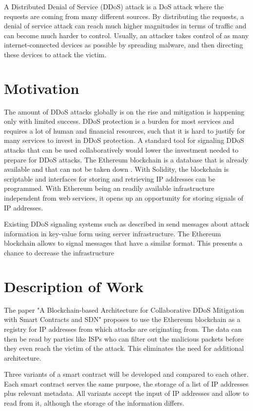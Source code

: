 A Distributed Denial of Service (DDoS) attack is a DoS attack where the requests are coming from many different sources. By distributing the requests, a denial of service attack can reach much higher magnitudes in terms of traffic and can become much harder to control.
Usually, an attacker takes control of as many internet-connected devices as possible by spreading malware, and then directing these devices to attack the victim.


\section{Motivation}

The amount of DDoS attacks globally is on the rise \cite{DDoSRise} and mitigation is happening only with limited success. 
DDoS protection is a burden for most services and requires a lot of human and financial resources, such that it is hard to justify for many services to invest in DDoS protection. A standard tool for signaling DDoS attacks that can be used collaboratively would lower the investment needed to prepare for DDoS attacks.
The Ethereum blockchain is a database that is already available and that can not be taken down \cite{Ethereum}. With Solidity, the blockchain is scriptable and interfaces for storing and retrieving IP addresses can be programmed. With Ethereum being an readily available infrastructure independent from web services, it opens up an opportunity for storing signals of IP addresses.

Existing DDoS signaling systems such as described in \cite{IETFDraft} send messages about attack information in key-value form using server infrastructure. The Ethereum blockchain allows to signal messages that have a similar format. This presents a chance to decrease the infrastructure

\section{Description of Work}

The paper {"}A Blockchain-based Architecture for Collaborative DDoS Mitigation with Smart Contracts and SDN{"} \cite{OriginalPaper} proposes to use the Ethereum blockchain as a registry for IP addresses from which attacks are originating from. The data can then be read by parties like ISPs who can filter out the malicious packets before they even reach the victim of the attack. This eliminates the need for additional architecture.

Three variants of a smart contract will be developed and compared to each other. Each smart contract serves the same purpose, the storage of a list of IP addresses plus relevant metadata. All variants accept the input of IP addresses and allow to read from it, although the storage of the information differs.

